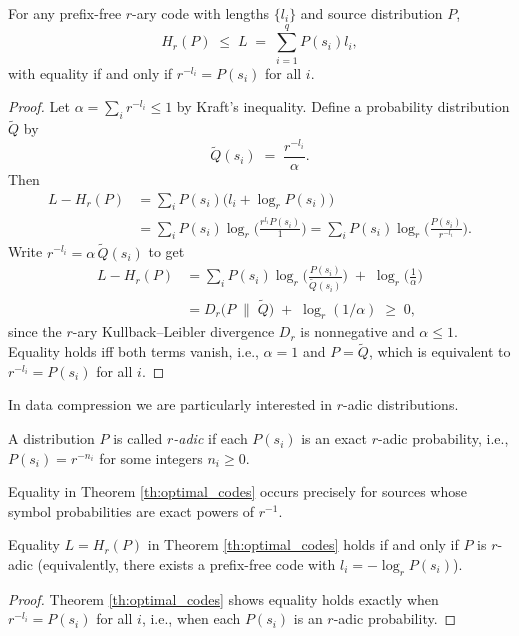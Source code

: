 \begin{theorem}
\label{th:optimal_codes}
For any prefix-free $r$-ary code with lengths $\{l_i\}$ and source distribution $P$,
\[
H_{r}(P) \;\le\; L \;=\; \sum_{i=1}^{q} P(s_i)l_i,
\]
with equality if and only if $r^{-l_{i}} = P(s_i)$ for all $i$.
\end{theorem}
\begin{proof}
Let $\alpha=\sum_{i} r^{-l_i}\le 1$ by Kraft's inequality. Define a probability distribution $\tilde{Q}$ by
\[
\tilde{Q}(s_i)\;=\;\frac{r^{-l_i}}{\alpha}.
\]
Then
\begin{equation*}
\begin{split}
L - H_r(P)
& = \sum_i P(s_i)\Big(l_i + \log_r P(s_i)\Big) \\
& = \sum_i P(s_i)\log_r\!\Big(\frac{r^{l_i}P(s_i)}{1}\Big)
= \sum_i P(s_i)\log_r\!\Big(\frac{P(s_i)}{r^{-l_i}}\Big).
\end{split}
\end{equation*}
Write $r^{-l_i}=\alpha\,\tilde{Q}(s_i)$ to get
\begin{equation*}
\begin{split}
L - H_r(P)
& = \sum_i P(s_i)\log_r\!\Big(\frac{P(s_i)}{\tilde{Q}(s_i)}\Big)
\;+\; \log_r\!\Big(\frac{1}{\alpha}\Big) \\
& = D_r\!\big(P\;\|\;\tilde{Q}\big) \;+\; \log_r(1/\alpha)\;\ge\;0,
\end{split}
\end{equation*}
since the $r$-ary Kullback–Leibler divergence $D_r$ is nonnegative and $\alpha\le 1$. Equality holds iff both terms vanish, i.e., $\alpha=1$ and $P=\tilde{Q}$, which is equivalent to $r^{-l_i}=P(s_i)$ for all $i$.
\end{proof}

In data compression we are particularly interested in $r$-adic distributions.

\begin{definition}
A distribution $P$ is called \emph{$r$-adic} if each $P(s_i)$ is an exact $r$-adic probability, i.e., $P(s_i)=r^{-n_i}$ for some integers $n_i \ge 0$.
\end{definition}

Equality in Theorem \ref{th:optimal_codes} occurs precisely for sources whose symbol probabilities are exact powers of $r^{-1}$.

\begin{corollary}
Equality $L=H_r(P)$ in Theorem \ref{th:optimal_codes} holds if and only if $P$ is $r$-adic (equivalently, there exists a prefix-free code with $l_i=-\log_r P(s_i)$).
\end{corollary}
\begin{proof}
Theorem \ref{th:optimal_codes} shows equality holds exactly when $r^{-l_i}=P(s_i)$ for all $i$, i.e., when each $P(s_i)$ is an $r$-adic probability.
\end{proof}

